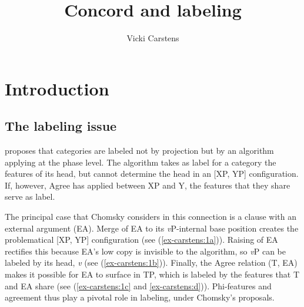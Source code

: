 \documentclass[output=paper
,modfonts
,nonflat]{langsci/langscibook}
\title{Concord and labeling}
\author{%
	Vicki Carstens\affiliation{Southern Illinois University}
}
\begin{document}
	\maketitle
\section{Introduction} \label{sec-carstens:1}
\subsection{The labeling issue} \label{sec-carstens:1.1}
\citet{Chomsky2013, Chomsky2015} proposes that categories are labeled not by projection but by an algorithm applying at the phase level. The algorithm takes as label for a category the features of its head, but cannot determine the head in an [XP, YP] configuration. If, however, Agree has applied between XP and Y, the features that they share serve as label. 

The principal case that Chomsky considers in this connection is a clause with an external argument (EA). Merge of EA to its \textit{v}P-internal base position creates the problematical [XP, YP] configuration (see (\ref{ex-carstens:1a})). Raising of EA rectifies this because EA’s low copy is invisible to the algorithm, so \textit{v}P can be labeled by its head, \textit{v} (see (\ref{ex-carstens:1b})). Finally, the Agree relation (T, EA) makes it possible for EA to surface in TP, which is labeled by the features that T and EA share (see (\ref{ex-carstens:1c} and \ref{ex-carstens:d})). Phi-features and agreement thus play a pivotal role in labeling, under Chomsky's proposals. 
\end{document}
